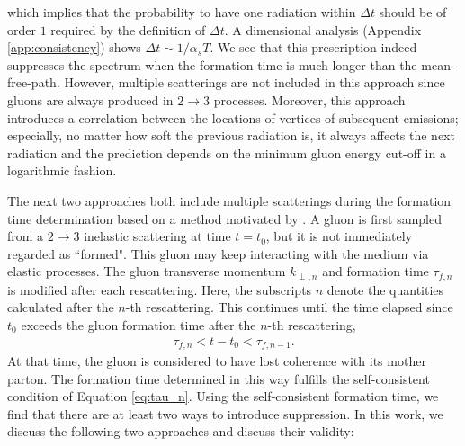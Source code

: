 \documentclass[aps, prc, reprint, amsmath, groupedaddress, nofootinbib]{revtex4-1}
\begin{document}
which implies that the probability to have one radiation within $\Delta t$ should be of order $1$ required by the definition of $\Delta t$.
A dimensional analysis (Appendix \ref{app:consistency}) shows $\Delta t \sim 1/\alpha_s T$.
We see that this prescription indeed suppresses the spectrum when the formation time is much longer than the mean-free-path. 
However, multiple scatterings are not included in this approach since gluons are always produced in $2\rightarrow3$ processes.
Moreover, this approach introduces a correlation between the locations of vertices of subsequent emissions;
especially, no matter how soft the previous radiation is, it always affects the next radiation and the prediction depends on the minimum gluon energy cut-off in a logarithmic fashion.

The next two approaches both include multiple scatterings  during the formation time determination based on a method motivated by \cite{Zapp:2011ya}.
A gluon is first sampled from a $2\rightarrow3$ inelastic scattering at time $t=t_0$, but it is not immediately regarded as ``formed". 
This gluon may keep interacting with the medium via elastic processes. The gluon transverse momentum $k_{\perp,n}$ and formation time $\tau_{f,n}$ is modified after each rescattering.
Here, the subscripts $n$ denote the quantities calculated after the $n$-th rescattering.
This continues until the time elapsed since $t_0$ exceeds the gluon formation time after the $n$-th rescattering,
\begin{eqnarray}\label{eq:self-consisten-condition}
\tau_{f, n} < t-t_0 < \tau_{f, n-1}.
\end{eqnarray}
At that time, the gluon is considered to have lost coherence with its mother parton.
The formation time determined in this way fulfills the self-consistent condition of Equation \ref{eq:tau_n}.
Using the self-consistent formation time, we find that there are at least two ways to introduce suppression. In this work, we discuss the following two approaches and discuss their validity:
\end{document}
